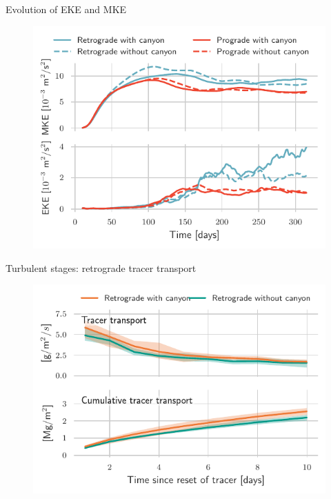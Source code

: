 \documentclass{beamer}
\begin{document}
\begin{frame}{Evolution of EKE and MKE}
\begin{figure}
\centering
\includegraphics{figures/EKE_MKE_temporal_mean_Stratified.pdf}
\end{figure}
\end{frame}

\begin{frame}{Turbulent stages: retrograde tracer transport}
\begin{figure}
\centering
\includegraphics{figures/exchange_Retrograde_composite_Stratified.pdf}
\end{figure}
\end{frame}
\end{document}
